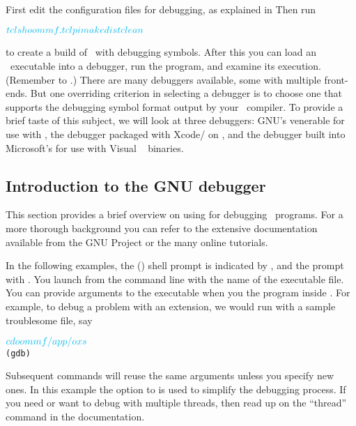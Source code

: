 First edit the configuration files for debugging, as explained in
Then run
\begin{alltt}
$ \shellcmd{tclsh oommf.tcl pimake distclean}
$ 
\end{alltt}\html{\newline}
to create a build of \OOMMF\ with debugging symbols. After this you can
load an \OOMMF\ executable into a debugger, run the
program, and examine its execution.  (Remember to .)  There are many debuggers
available, some with multiple front-ends. But one overriding criterion
in selecting a debugger is to choose one that supports the debugging
symbol format output by your \Cplusplus\ compiler. To provide a brief
taste of this subject, we will look at three debuggers: GNU's venerable
 for use with , the  debugger packaged with
Xcode/ on \MacOSX, and the debugger built into Microsoft's
 for use with Visual \Cplusplus\  binaries.

\subsection{Introduction to the GNU  debugger}\label{sec:debug:gdbintro}
This section provides a brief overview on using  for debugging
\OOMMF\ programs. For a more thorough background you can refer to the
extensive documentation available from the GNU Project or the many
online tutorials.

In the following examples, the () shell prompt is indicated by
\cd{\$}, and the  prompt with . You launch 
from the command line with the name of the executable file. You can
provide arguments to the executable when you  the program inside
. For example, to debug a problem with an  extension,
we would run  with a sample troublesome  file, say
\begin{alltt}
$ \shellcmd{cd oommf/app/oxs}
$ 
(gdb) 
\end{alltt}\html{\newline}
Subsequent  commands will reuse the same arguments unless you
specify new ones. In this example the  option to
 is used to simplify the debugging process. If you need or
want to debug with multiple threads, then read up on the ``thread''
command in the  documentation.

